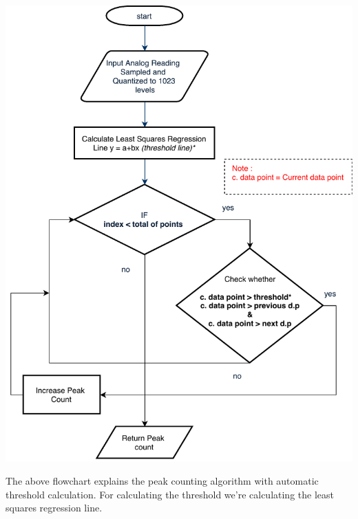 \documentclass[12pt]{article}
\begin{document}
	\begin{center}
	\includegraphics[scale=0.9]{peak_count}
	\end{center}

	The above flowchart explains the peak counting algorithm with automatic threshold calculation. For calculating the threshold we're calculating the least squares regression line.
		
\end{document}
